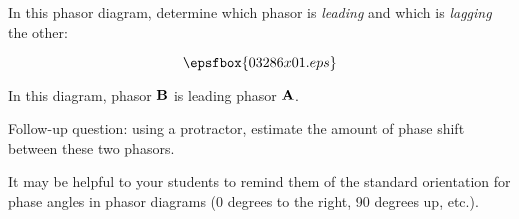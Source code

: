 

In this phasor diagram, determine which phasor is {\it leading} and which is {\it lagging} the other:

$$\epsfbox{03286x01.eps}$$








In this diagram, phasor ${\bf B}$ is leading phasor ${\bf A}$.

\vskip 10pt

Follow-up question: using a protractor, estimate the amount of phase shift between these two phasors.







It may be helpful to your students to remind them of the standard orientation for phase angles in phasor diagrams (0 degrees to the right, 90 degrees up, etc.).




